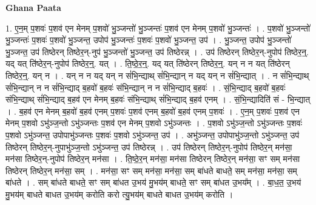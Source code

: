 \documentclass[17pt]{extarticle}
\begin{document}
\textbf{Ghana Paata } \newline

1. ए॒न॒म् प॒शवः॑ प॒शव॑ एन मेनम् प॒शवो॑ भु॒ञ्जन्तो॑ भु॒ञ्जन्तः॑ प॒शव॑ एन मेनम् प॒शवो॑ भु॒ञ्जन्तः॑ । . प॒शवो॑ भु॒ञ्जन्तो॑ भु॒ञ्जन्तः॑ प॒शवः॑ प॒शवो॑ भु॒ञ्जन्त॒ उपोप॑ भु॒ञ्जन्तः॑ प॒शवः॑ प॒शवो॑ भु॒ञ्जन्त॒ उप॑ । . भु॒ञ्जन्त॒ उपोप॑ भु॒ञ्जन्तो॑ भु॒ञ्जन्त॒ उप॑ तिष्ठेरन् तिष्ठेर॒न्-नुप॑ भु॒ञ्जन्तो॑ भु॒ञ्जन्त॒ उप॑ तिष्ठेरन्न् । . उप॑ तिष्ठेरन् तिष्ठेर॒न्-नुपोप॑ तिष्ठेर॒न्॒. यद् यत् ति॑ष्ठेर॒न्-नुपोप॑ तिष्ठेर॒न्॒. यत् । . ति॒ष्ठे॒र॒न्॒. यद् यत् ति॑ष्ठेरन् तिष्ठेर॒न्॒. यन् न न यत् ति॑ष्ठेरन् तिष्ठेर॒न्॒. यन् न । . यन् न न यद् यन् न सं॑भि॒न्द्याथ् सं॑भि॒न्द्यान् न यद् यन् न सं॑भि॒न्द्यात् । . न सं॑भि॒न्द्याथ् सं॑भि॒न्द्यान् न न सं॑भि॒न्द्याद् ब॒हवो॑ ब॒हवः॑ संभि॒न्द्यान् न न सं॑भि॒न्द्याद् ब॒हवः॑ । . सं॒भि॒न्द्याद् ब॒हवो॑ ब॒हवः॑ संभि॒न्द्याथ् सं॑भि॒न्द्याद् ब॒हव॑ एन मेनम् ब॒हवः॑ संभि॒न्द्याथ् सं॑भि॒न्द्याद् ब॒हव॑ एनम् । . सं॒भि॒न्द्यादिति॑ सं - भि॒न्द्यात् । . ब॒हव॑ एन मेनम् ब॒हवो॑ ब॒हव॑ एनम् प॒शवः॑ प॒शव॑ एनम् ब॒हवो॑ ब॒हव॑ एनम् प॒शवः॑ । . ए॒न॒म् प॒शवः॑ प॒शव॑ एन मेनम् प॒शवो ऽभु॑ञ्ज॒न्तो ऽभु॑ञ्जन्तः प॒शव॑ एन मेनम् प॒शवो ऽभु॑ञ्जन्तः । . प॒शवो ऽभु॑ञ्ज॒न्तो ऽभु॑ञ्जन्तः प॒शवः॑ प॒शवो ऽभु॑ञ्जन्त॒ उपोपाभु॑ञ्जन्तः प॒शवः॑ प॒शवो ऽभु॑ञ्जन्त॒ उप॑ । . अभु॑ञ्जन्त॒ उपोपाभु॑ञ्ज॒न्तो ऽभु॑ञ्जन्त॒ उप॑ तिष्ठेरन् तिष्ठेर॒न्-नुपाभु॑ञ्ज॒न्तो ऽभु॑ञ्जन्त॒ उप॑ तिष्ठेरन्न् । . उप॑ तिष्ठेरन् तिष्ठेर॒न्-नुपोप॑ तिष्ठेर॒न् मन॑सा॒ मन॑सा तिष्ठेर॒न्-नुपोप॑ तिष्ठेर॒न् मन॑सा । . ति॒ष्ठे॒र॒न् मन॑सा॒ मन॑सा तिष्ठेरन् तिष्ठेर॒न् मन॑सा॒ सꣳ सम् मन॑सा तिष्ठेरन् तिष्ठेर॒न् मन॑सा॒ सम् । . मन॑सा॒ सꣳ सम् मन॑सा॒ मन॑सा॒ सम् बा॑धते बाधते॒ सम् मन॑सा॒ मन॑सा॒ सम् बा॑धते । . सम् बा॑धते बाधते॒ सꣳ सम् बा॑धत उ॒भय॑ मु॒भय॑म् बाधते॒ सꣳ सम् बा॑धत उ॒भय᳚म् । . बा॒ध॒त॒ उ॒भय॑ मु॒भय॑म् बाधते बाधत उ॒भय॑म् करोति करो त्यु॒भय॑म् बाधते बाधत उ॒भय॑म् करोति । \newline
\end{document}
